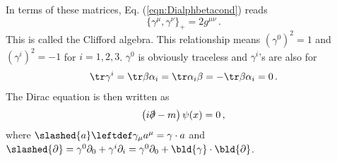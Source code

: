 In terms of these matrices, Eq. (\ref{eqn:Dialphbetacond}) reads
\begin{equation}
\{ \gamma^\mu, \gamma^\nu \}_+ = 2 g^{\mu \nu}\,.
\end{equation}
This is called the Clifford algebra. This relationship means $(\gamma^0)^2 = 1$ and $(\gamma^i)^2 = -1$ for $i = 1,2,3$.
$\gamma^0$ is obviously traceless and $\gamma^i$'s are also for
\begin{eqnarray}
\tr \gamma^i = \tr \beta \alpha_i = \tr \alpha_i \beta = -\tr \beta \alpha_i = 0\,.
\end{eqnarray}
The Dirac equation is then written as
\begin{eqnarray}
\left( i\slashed{\partial} - m \right) \psi(x) = 0\,,
\label{eqn:DiracEqstandard}
\end{eqnarray}
where $\slashed{a} \leftdef \gamma_\mu a^\mu = \gamma \cdot a$ and
$\slashed{\partial} = \gamma^0 \partial_0 + \gamma^i \partial_i = \gamma^0 \partial_0 + \bld{\gamma}\cdot \bld{\partial}$.


